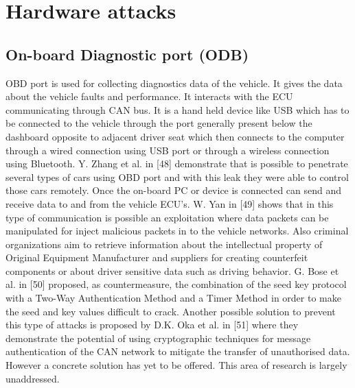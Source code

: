 \section{Hardware attacks}

    \subsection{On-board Diagnostic port (ODB)}
    OBD port is used for collecting diagnostics data of the vehicle. It gives the data about the vehicle faults and performance. It interacts with the ECU communicating through CAN bus. It is a hand held device like USB which has to be connected to the vehicle through the port generally present below the dashboard opposite to adjacent driver seat which then connects to the computer through a wired connection using USB port or through a wireless connection using Bluetooth. 
    \newline
    Y. Zhang et al. in [48] demonstrate that is possible to penetrate several types of cars using OBD port and with this leak they were able to control those cars remotely. 
    Once the on-board PC or device is connected can send and receive data to and from the vehicle ECU’s. W. Yan in [49] shows that in this type of communication is possible an exploitation where data packets can be manipulated for inject malicious packets in to the vehicle networks. Also criminal organizations aim to retrieve information about the intellectual property of Original Equipment Manufacturer and suppliers for creating counterfeit components or about driver sensitive data such as driving behavior.
    \newline
    G. Bose et al. in [50] proposed, as countermeasure, the combination of the seed key protocol with a Two-Way Authentication Method and a Timer Method in order to make the seed and key values difficult to crack.
    Another possible solution to prevent this type of attacks is proposed by D.K. Oka et al. in [51] where they demonstrate the potential of using cryptographic techniques for message authentication of the CAN network to mitigate the transfer of unauthorised data. 
    \newline
    However a concrete solution has yet to be offered. This area of research is largely unaddressed.
    
